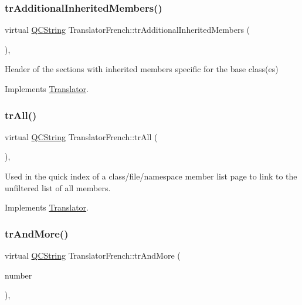 \subsubsection{\texorpdfstring{trAdditionalInheritedMembers()}{trAdditionalInheritedMembers()}}
{\footnotesize\ttfamily virtual \mbox{\hyperlink{class_q_c_string}{Q\+C\+String}} Translator\+French\+::tr\+Additional\+Inherited\+Members (\begin{DoxyParamCaption}{ }\end{DoxyParamCaption})\hspace{0.3cm}{\ttfamily [inline]}, {\ttfamily [virtual]}}

Header of the sections with inherited members specific for the base class(es) 

Implements \mbox{\hyperlink{class_translator}{Translator}}.

\mbox{\label{class_translator_french_a1f992ca71553f17e6a2020281a59189b}} 
\subsubsection{\texorpdfstring{trAll()}{trAll()}}
{\footnotesize\ttfamily virtual \mbox{\hyperlink{class_q_c_string}{Q\+C\+String}} Translator\+French\+::tr\+All (\begin{DoxyParamCaption}{ }\end{DoxyParamCaption})\hspace{0.3cm}{\ttfamily [inline]}, {\ttfamily [virtual]}}

Used in the quick index of a class/file/namespace member list page to link to the unfiltered list of all members. 

Implements \mbox{\hyperlink{class_translator}{Translator}}.

\mbox{\label{class_translator_french_aded25fde5944bb360fb580ba22f21c07}} 
\subsubsection{\texorpdfstring{trAndMore()}{trAndMore()}}
{\footnotesize\ttfamily virtual \mbox{\hyperlink{class_q_c_string}{Q\+C\+String}} Translator\+French\+::tr\+And\+More (\begin{DoxyParamCaption}\item[{const \mbox{\hyperlink{class_q_c_string}{Q\+C\+String}} \&}]{number }\end{DoxyParamCaption})\hspace{0.3cm}{\ttfamily [inline]}, {\ttfamily [virtual]}}

